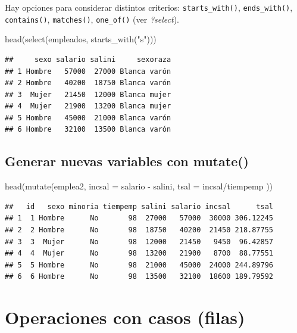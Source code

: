 \documentclass[
]{book}
\newenvironment{Shaded}{\begin{snugshade}}{\end{snugshade}}
\newcommand{\AttributeTok}[1]{\textcolor[rgb]{0.77,0.63,0.00}{#1}}
\newcommand{\FunctionTok}[1]{\textcolor[rgb]{0.00,0.00,0.00}{#1}}
\newcommand{\NormalTok}[1]{#1}
\newcommand{\SpecialCharTok}[1]{\textcolor[rgb]{0.00,0.00,0.00}{#1}}
\newcommand{\StringTok}[1]{\textcolor[rgb]{0.31,0.60,0.02}{#1}}
\theoremstyle{break}
\begin{document}
Hay opciones para considerar distintos criterios: \texttt{starts\_with()}, \texttt{ends\_with()},
\texttt{contains()}, \texttt{matches()}, \texttt{one\_of()} (ver \emph{?select}).

\begin{Shaded}
\begin{Highlighting}[]
\FunctionTok{head}\NormalTok{(}\FunctionTok{select}\NormalTok{(empleados, }\FunctionTok{starts\_with}\NormalTok{(}\StringTok{"s"}\NormalTok{)))}
\end{Highlighting}
\end{Shaded}

\begin{verbatim}
##     sexo salario salini     sexoraza
## 1 Hombre   57000  27000 Blanca varón
## 2 Hombre   40200  18750 Blanca varón
## 3  Mujer   21450  12000 Blanca mujer
## 4  Mujer   21900  13200 Blanca mujer
## 5 Hombre   45000  21000 Blanca varón
## 6 Hombre   32100  13500 Blanca varón
\end{verbatim}

\hypertarget{generar-nuevas-variables-con-mutate}{%
\subsection{\texorpdfstring{Generar nuevas variables con \textbf{mutate()}}{Generar nuevas variables con mutate()}}\label{generar-nuevas-variables-con-mutate}}

\begin{Shaded}
\begin{Highlighting}[]
\FunctionTok{head}\NormalTok{(}\FunctionTok{mutate}\NormalTok{(emplea2, }\AttributeTok{incsal =}\NormalTok{ salario }\SpecialCharTok{{-}}\NormalTok{ salini, }\AttributeTok{tsal =}\NormalTok{ incsal}\SpecialCharTok{/}\NormalTok{tiempemp ))}
\end{Highlighting}
\end{Shaded}

\begin{verbatim}
##   id   sexo minoria tiempemp salini salario incsal      tsal
## 1  1 Hombre      No       98  27000   57000  30000 306.12245
## 2  2 Hombre      No       98  18750   40200  21450 218.87755
## 3  3  Mujer      No       98  12000   21450   9450  96.42857
## 4  4  Mujer      No       98  13200   21900   8700  88.77551
## 5  5 Hombre      No       98  21000   45000  24000 244.89796
## 6  6 Hombre      No       98  13500   32100  18600 189.79592
\end{verbatim}

\hypertarget{operaciones-con-casos-filas}{%
\section{Operaciones con casos (filas)}\label{operaciones-con-casos-filas}}
\end{document}

